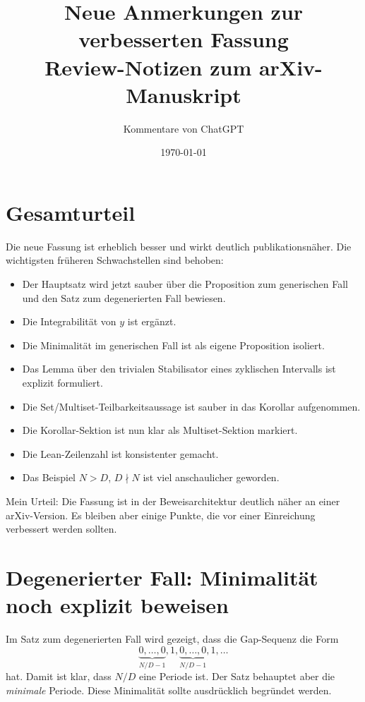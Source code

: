 \documentclass[11pt]{article}
\title{Neue Anmerkungen zur verbesserten Fassung\\
\large Review-Notizen zum arXiv-Manuskript}
\author{Kommentare von ChatGPT}
\date{\today}
\begin{document}
\maketitle

\section*{Gesamturteil}

Die neue Fassung ist erheblich besser und wirkt deutlich publikationsnäher. Die wichtigsten früheren Schwachstellen sind behoben:

\begin{itemize}[leftmargin=2em]
    \item Der Hauptsatz wird jetzt sauber über die Proposition zum generischen Fall und den Satz zum degenerierten Fall bewiesen.
    \item Die Integrabilität von \(y\) ist ergänzt.
    \item Die Minimalität im generischen Fall ist als eigene Proposition isoliert.
    \item Das Lemma über den trivialen Stabilisator eines zyklischen Intervalls ist explizit formuliert.
    \item Die Set/Multiset-Teilbarkeitsaussage ist sauber in das Korollar aufgenommen.
    \item Die Korollar-Sektion ist nun klar als Multiset-Sektion markiert.
    \item Die Lean-Zeilenzahl ist konsistenter gemacht.
    \item Das Beispiel \(N>D\), \(D\nmid N\) ist viel anschaulicher geworden.
\end{itemize}

Mein Urteil: Die Fassung ist in der Beweisarchitektur deutlich näher an einer arXiv-Version. Es bleiben aber einige Punkte, die vor einer Einreichung verbessert werden sollten.

\section{Degenerierter Fall: Minimalität noch explizit beweisen}

Im Satz zum degenerierten Fall wird gezeigt, dass die Gap-Sequenz die Form
\[
    \underbrace{0,\ldots,0}_{N/D-1},1,
    \underbrace{0,\ldots,0}_{N/D-1},1,\ldots
\]
hat. Damit ist klar, dass \(N/D\) eine Periode ist. Der Satz behauptet aber die \emph{minimale} Periode. Diese Minimalität sollte ausdrücklich begründet werden.
\end{document}
